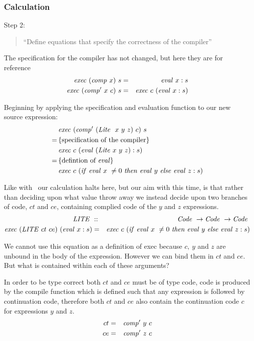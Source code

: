 \documentclass {article}
\begin{document}
\subsubsection{Calculation}

Step 2:
\begin{quote}
``Define equations that specify the correctness of the compiler''
\end{quote}
The specification for the compiler has not
changed, but here they are for reference 
\begin{eqnarray}
\mathit{exec\ }  (\mathit{comp\ }  x)\  s &=& \mathit{eval\ }   x:s \label{spec1.3}\\
\mathit{exec\ }  (\mathit{comp'\ }   x\  c)\ s &=& \mathit{exec\ }  c\  (\mathit{eval\ }  x:s) \label{spec2.3}
\end{eqnarray}

Beginning by applying the 
specification and evaluation function
to our new source expression:
\begin{align*}
	&\Exec (\Compp  (\Lite\ x\ y\ z)\ c)\ s \\
	=\, & \{\mbox{specification of 
				the compiler} \} \\
	&\Exec c\ (\evalf  (\Lite x\ y\ z) : s) \\
	=\, & \{ \mbox{defintion of \eval} \} \\
	&\Exec c\ (\ifff \evalf  x\ \not= 0\ 
		\tthen \evalf  y\ \eelse \evalf  z : s)
\end{align*}

Like with \ite\ our calculation halts here,
but our aim with this time, is that 
rather than deciding upon what value throw away
we instead decide upon two branches of code, $ct$ and $ce$,
containing complied code of the $y$ and $z$ expressions.
\newcommand{\LITE}{\mathit{LITE\ }}
\newcommand{\LITEt}{\textit{LITE}}
\begin{eqnarray}
\LITE &::& \Code \rightarrow \Code \rightarrow \Code \nonumber \\
\Exec (\LITE ct\ ce)\ (\evalf  x:s) 
			&=& \Exec c\ (\ifff \evalf  x\ \not= 0\ 
				\tthen \evalf  y\ \eelse \evalf  z : s) \nonumber \\
\label{execlite}
\end{eqnarray}

We cannot use this equation as a definition of exec 
because $c,\ y$ and $z$ are unbound in the 
body of the expression\cite[page 10]{bandh}.
However we can bind them in $ct$ and $ce$.
But what is contained within each of these
arguments?

In order to be type correct both $ct$ and $ce$
must be of type code, code is produced by the 
compile function which is defined 
such that any expression is followed by
continuation code,
therefore both $ct$ and $ce$ also contain 
the continuation code $c$ for expressions
 $y$ and $z$.
\begin{eqnarray*}
	ct &=& \mathit{comp'\ }  y\ c \\
	ce &=& \mathit{comp'\ }  z\ c
\end{eqnarray*}
\end{document}
